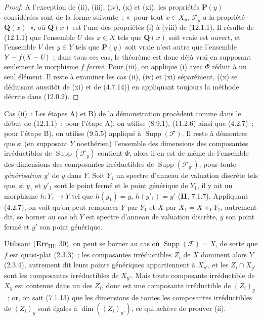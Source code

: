 \begin{proof}
A l'exception de (ii), (iii), (iv), (x) et (xi), les propriétés $\boldsymbol{P}(y)$
considérées sont de la forme suivante~: «~pour tout $x\in X_y$, $\mathcal F_y$
a la propriété $\boldsymbol{Q}(x)$~», où $\boldsymbol{Q}(x)$ est l'une des propriétés (i) à (viii) de
(12.1.1). Il résulte de (12.1.1) que l'ensemble $U$ des $x\in X$ tels que
$\boldsymbol{Q}(x)$ soit vraie est ouvert, et l'ensemble $V$ des $y\in Y$ tels que $\boldsymbol{P}(y)$
soit vraie n'est autre que l'ensemble $Y- f(X- U)$~; dans tous ces cas, le
théorème est donc déjà vrai en supposant seulement le morphisme $f$ \emph{fermé}.
Pour (iii), on applique (i) avec $\Phi$ réduit à un seul élément. Il reste à
examiner les cas (ii), (iv) et (xi) séparément, ((x) se déduisant aussitôt de
(xi) et de (4.7.14)) en appliquant toujours la méthode décrite dans (12.0.2).
\end{proof}

\begin{env}[12.2.1.1]
\label{IV.12.2.1.1-fr}
Cas (ii)~: Les étapes A) et B) de la démonstration procèdent comme dans le
début de (12.1.1)~; pour l'étape A), on utilise (8.9.1), (11.2.6) ainsi que
(4.2.7)~; pour l'étape B), on utilise (9.5.5) appliqué à
$\operatorname{Supp}(\mathcal F)$. Il reste à démontrer que si (en supposant
$Y$ noethérien) l'ensemble des dimensions des composantes irréductibles de
$\operatorname{Supp}(\mathcal F_y)$ contient $\Phi$, alors il en est de même
de l'ensemble des dimensions des composantes irréductibles de
$\operatorname{Supp}(\mathcal F_{y'})$, pour toute \emph{générisation} $y'$ de
$y$ dans $Y$. Soit $Y_1$ un spectre d'anneau de valuation discrète tels que, si
$y_1$ et $y'_1$ sont le point fermé et le point générique de $Y_1$, il y ait un
morphisme $h:Y_1\to Y$ tel que $h(y_1)=y$, $h(y'_1)=y'$ (\textbf{II}, 7.1.7).
Appliquant (4.2.7), on voit qu'on peut remplacer $Y$ par $Y_1$ et $X$ par
$X_1=X\times_YY_1$, autrement dit, se borner au cas où $Y$ est spectre
d'anneau de valuation discrète, $y$ son point fermé et $y'$ son point générique.

Utilisant (\textbf{Err}\textsubscript{III}, 30), on peut se borner au
cas où $\operatorname{Supp}(\mathcal F)=X$, de sorte que $f$ est quasi-plat
(2.3.3)~; les composantes irréductibles $Z_i$ de $X$ dominent alors $Y$
(2.3.4), autrement dit leurs points génériques appartiennent à $X_{y'}$, et
les $Z_i\cap X_{y'}$ sont les composantes irréductibles de $X_{y'}$. Mais toute
composante irréductible de $X_y$ est contenue dans un des $Z_i$, donc est une
composante irréductible de $(Z_i)_y$~; or, on sait (7.1.13) que les dimensions
de toutes les composantes irréductibles de $(Z_i)_y$ sont égales à
$\dim((Z_i)_{y'})$, ce qui achève de prouver (ii).
\end{env}

